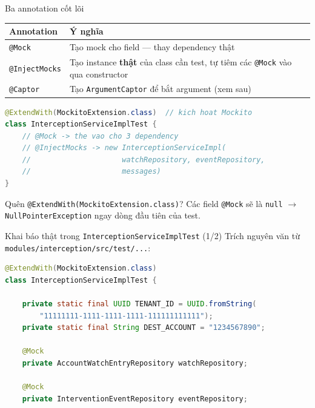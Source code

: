 \documentclass[aspectratio=169,12pt]{beamer}
\begin{document}
\begin{frame}[fragile]{Ba annotation cốt lõi}
  \begin{center}
  \small
  \begin{tabular}{p{2.8cm}p{9.6cm}}
    \toprule
    \textbf{Annotation} & \textbf{Ý nghĩa} \\
    \midrule
    \texttt{@Mock} & Tạo mock cho field --- thay dependency thật \\
    \texttt{@InjectMocks} & Tạo instance \textbf{thật} của class cần test,
      tự tiêm các \texttt{@Mock} vào qua constructor \\
    \texttt{@Captor} & Tạo \texttt{ArgumentCaptor} để bắt argument (xem sau) \\
    \bottomrule
  \end{tabular}
  \end{center}

\begin{lstlisting}[language=java,basicstyle=\ttfamily\scriptsize,aboveskip=0pt,belowskip=0pt]
@ExtendWith(MockitoExtension.class)  // kich hoat Mockito
class InterceptionServiceImplTest {
    // @Mock -> the vao cho 3 dependency
    // @InjectMocks -> new InterceptionServiceImpl(
    //                     watchRepository, eventRepository,
    //                     messages)
}
\end{lstlisting}

  \begin{alertblock}{Quên \texttt{@ExtendWith(MockitoExtension.class)}?}
    Các field \texttt{@Mock} sẽ là \texttt{null} $\to$
    \texttt{NullPointerException} ngay dòng đầu tiên của test.
  \end{alertblock}
\end{frame}

\begin{frame}[fragile]{Khai báo thật trong \texttt{InterceptionServiceImplTest} (1/2)}
  Trích nguyên văn từ \texttt{modules/interception/src/test/...}:
\begin{lstlisting}[language=java,basicstyle=\ttfamily\scriptsize]
@ExtendWith(MockitoExtension.class)
class InterceptionServiceImplTest {

    private static final UUID TENANT_ID = UUID.fromString(
        "11111111-1111-1111-1111-111111111111");
    private static final String DEST_ACCOUNT = "1234567890";

    @Mock
    private AccountWatchEntryRepository watchRepository;

    @Mock
    private InterventionEventRepository eventRepository;
\end{lstlisting}
\end{frame}
\end{document}
